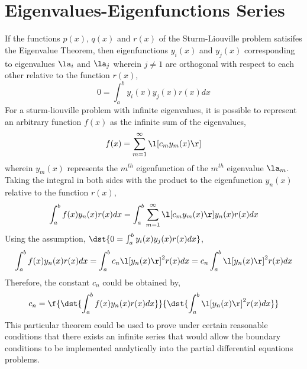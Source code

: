 \section{Eigenvalues-Eigenfunctions Series}
\begin{comment}
\end{comment}
If the functions $p(x)$, $q(x)$ and $r(x)$ of the Sturm-Liouville problem satisifes the Eigenvalue Theorem, then eigenfunctions $y_i(x)$ and $y_j(x)$ corresponding to eigenvalues $\la_i$ and $\la_j$ wherein $j\neq1$ are orthogonal with respect to each other relative to the function $r(x)$,
$$0 = \int^{b}_{a}y_i(x)y_j(x)r(x)dx$$
For a sturm-liouville problem with infinite eigenvalues, it is possible to represent an arbitrary function $f(x)$ as the infinite sum of the eigenvalues,
$$f(x) = \sum^{\infty}_{m=1}\l[c_my_m(x)\r]$$
wherein $y_m(x)$ represents the $m^{th}$ eigenfunction of the $m^{th}$ eigenvalue $\la_m$. Taking the integral in both sides with the product to the eigenfunction $y_n(x)$ relative to the function $r(x)$,
$$\int^{b}_{a}f(x)y_n(x)r(x)dx = \int^{b}_{a}\sum^{\infty}_{m=1}\l[c_my_m(x)\r]y_n(x)r(x)dx$$
Using the assumption, $\dst{0 = \int^{b}_{a}y_i(x)y_j(x)r(x)dx}$,
$$\int^{b}_{a}f(x)y_n(x)r(x)dx = \int^{b}_{a}c_n\l[y_n(x)\r]^2r(x)dx = c_n\int^{b}_{a}\l[y_n(x)\r]^2r(x)dx$$
Therefore, the constant $c_n$ could be obtained by,
$$c_n = \f{\dst{\int^{b}_{a}f(x)y_n(x)r(x)dx}}{\dst{\int^{b}_{a}\l[y_n(x)\r]^2r(x)dx}}$$
This particular theorem could be used to prove under certain reasonable conditions that there exists an infinite series that would allow the boundary conditions to be implemented analytically into the partial differential equations problems.
